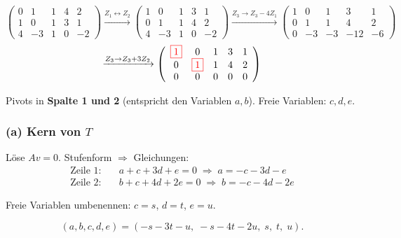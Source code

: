 \documentclass[a4paper,12pt]{article}
\newcommand{\piv}[1]{{\color{red}\boxed{#1}}}
\begin{document}
\[
\left(\begin{array}{ccccc}
0 & 1 & 1 & 4 & 2 \\
1 & 0 & 1 & 3 & 1 \\
4 & -3 & 1 & 0 & -2
\end{array}\right)
\xrightarrow{Z_1 \leftrightarrow Z_2}
\left(\begin{array}{ccccc}
1 & 0 & 1 & 3 & 1 \\
0 & 1 & 1 & 4 & 2 \\
4 & -3 & 1 & 0 & -2
\end{array}\right)
\xrightarrow{Z_3 \to Z_3 - 4Z_1}
\left(\begin{array}{ccccc}
1 & 0 & 1 & 3 & 1 \\
0 & 1 & 1 & 4 & 2 \\
0 & -3 & -3 & -12 & -6
\end{array}\right)
\]
\[
\xrightarrow{Z_3 \to Z_3 + 3Z_2}
\left(\begin{array}{ccccc}
\piv{1} & 0 & 1 & 3 & 1 \\
0 & \piv{1} & 1 & 4 & 2 \\
0 & 0 & 0 & 0 & 0
\end{array}\right)
\]

Pivots in \textbf{Spalte 1 und 2} (entspricht den Variablen $a, b$). Freie Variablen: $c, d, e$.

\subsubsection*{(a) Kern von $T$}

L\"ose $Av = 0$. Stufenform $\Rightarrow$ Gleichungen:
\begin{align*}
\text{Zeile 1:} &\quad a + c + 3d + e = 0 \;\Rightarrow\; a = -c - 3d - e \\
\text{Zeile 2:} &\quad b + c + 4d + 2e = 0 \;\Rightarrow\; b = -c - 4d - 2e
\end{align*}

Freie Variablen umbenennen: $c = s$, $d = t$, $e = u$.

\[
(a, b, c, d, e) = (-s - 3t - u,\; -s - 4t - 2u,\; s,\; t,\; u).
\]
\end{document}
